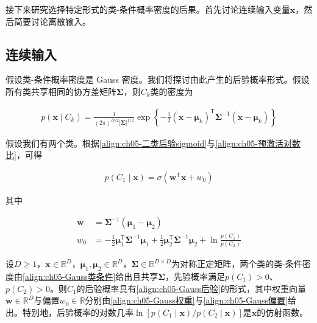 \documentclass[../../main.tex]{subfiles}
\begin{document}
接下来研究选择特定形式的类-条件概率密度的后果。首先讨论连续输入变量$\boldsymbol{x}$，然后简要讨论离散输入。

\subsection{连续输入}\label{subsection:ch05-连续输入}

假设类-条件概率密度是 Gauss 密度。我们将探讨由此产生的后验概率形式。假设所有类共享相同的协方差矩阵$\boldsymbol{\Sigma}$，则$C_k$类的密度为

\begin{align}
  p(\boldsymbol{x}\mid C_k)=\frac{1}{(2\pi)^{D/2}\lvert\boldsymbol{\Sigma}\rvert^{1/2}}\exp\left\{-\frac{1}{2}(\boldsymbol{x}-\boldsymbol{\mu}_k)^{\mathsf{T}}\boldsymbol{\Sigma}^{-1}(\boldsymbol{x}-\boldsymbol{\mu}_k)\right\}
  \label{align:ch05-Gauss类条件}
\end{align}

假设我们有两个类。根据\eqref{align:ch05-二类后验sigmoid}与\eqref{align:ch05-预激活对数比}，可得

\begin{align}
  p(C_1\mid\boldsymbol{x})=\sigma(\boldsymbol{w}^{\mathsf{T}}\boldsymbol{x}+w_0)
  \label{align:ch05-Gauss后验}
\end{align}

其中

\begin{align}
  \boldsymbol{w}&=\boldsymbol{\Sigma}^{-1}(\boldsymbol{\mu}_1-\boldsymbol{\mu}_2)
  \label{align:ch05-Gauss权重}\\
  w_0&=-\frac{1}{2}\boldsymbol{\mu}_1^{\mathsf{T}}\boldsymbol{\Sigma}^{-1}\boldsymbol{\mu}_1+\frac{1}{2}\boldsymbol{\mu}_2^{\mathsf{T}}\boldsymbol{\Sigma}^{-1}\boldsymbol{\mu}_2+\ln\frac{p(C_1)}{p(C_2)}
  \label{align:ch05-Gauss偏置}
\end{align}

\begin{proposition}\label{proposition:ch05-Gauss线性后验}
设$D\geqslant1$，$\boldsymbol{x}\in\mathbb{R}^{D}$，$\boldsymbol{\mu}_1,\boldsymbol{\mu}_2\in\mathbb{R}^{D}$，$\boldsymbol{\Sigma}\in\mathbb{R}^{D\times D}$为对称正定矩阵，两个类的类-条件密度由\eqref{align:ch05-Gauss类条件}给出且共享$\boldsymbol{\Sigma}$，先验概率满足$p(C_1)>0$、$p(C_2)>0$。则$C_1$的后验概率具有\eqref{align:ch05-Gauss后验}的形式，其中权重向量$\boldsymbol{w}\in\mathbb{R}^{D}$与偏置$w_0\in\mathbb{R}$分别由\eqref{align:ch05-Gauss权重}与\eqref{align:ch05-Gauss偏置}给出。特别地，后验概率的对数几率$\ln[p(C_1\mid\boldsymbol{x})/p(C_2\mid\boldsymbol{x})]$是$\boldsymbol{x}$的仿射函数。
\end{proposition}
\end{document}
